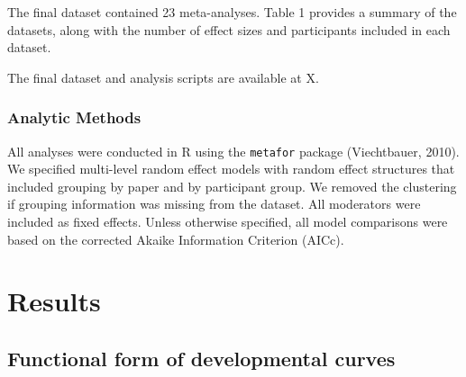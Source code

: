 \documentclass[10pt, letterpaper]{article}
\begin{document}
The final dataset contained 23 meta-analyses. Table 1 provides a summary
of the datasets, along with the number of effect sizes and participants
included in each dataset.

The final dataset and analysis scripts are available at X.

\hypertarget{analytic-methods}{%
\subsubsection{Analytic Methods}\label{analytic-methods}}

All analyses were conducted in R using the \texttt{metafor} package
(Viechtbauer, 2010). We specified multi-level random effect models with
random effect structures that included grouping by paper and by
participant group. We removed the clustering if grouping information was
missing from the dataset. All moderators were included as fixed effects.
Unless otherwise specified, all model comparisons were based on the
corrected Akaike Information Criterion (AICc).

\hypertarget{results}{%
\section{Results}\label{results}}

\hypertarget{functional-form-of-developmental-curves}{%
\subsection{Functional form of developmental
curves}\label{functional-form-of-developmental-curves}}
\end{document}
